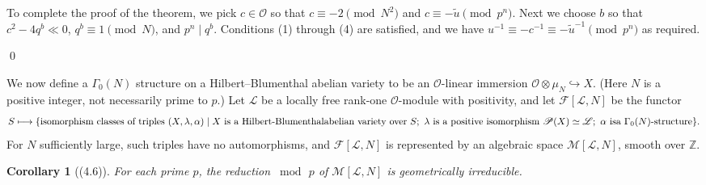 \documentclass[12pt,a4paper]{article}
\theoremstyle{plain}
\newtheorem{corollary}[theorem]{Corollary}
\theoremstyle{definition}
\theoremstyle{remark}
\begin{document}
To complete the proof of the theorem, we pick $c \in \mathcal{O}$ so that $c \equiv -2 \pmod{N^2}$ and $c \equiv -\tilde{u} \pmod{p^n}$. Next we choose $b$ so that $c^2 - 4q^b \ll 0$, $q^b \equiv 1 \pmod{N}$, and $p^n \mid q^b$. Conditions (1) through (4) are satisfied, and we have $u^{-1} \equiv -c^{-1} \equiv -\tilde{u}^{-1} \pmod{p^n}$ as required.

\qed

We now define a $\Gamma_0(N)$ structure on a Hilbert--Blumenthal abelian variety to be an $\mathcal{O}$-linear immersion $\mathcal{O} \otimes \mu_N \hookrightarrow X$. (Here $N$ is a positive integer, not necessarily prime to $p$.) Let $\mathscr{L}$ be a locally free rank-one $\mathcal{O}$-module with positivity, and let $\mathscr{F}[\mathscr{L}, N]$ be the functor
\[
S \longmapsto \{\text{isomorphism classes of triples } (X, \lambda, \alpha) \mid X \text{ is a Hilbert-Blumenthal} \\
\text{abelian variety over } S;\ \lambda \text{ is a positive isomorphism } \mathscr{P}(X) \simeq \mathscr{L};\ \alpha \text{ is} \\
\text{a } \Gamma_0(N)\text{-structure}\}.
\]
For $N$ sufficiently large, such triples have no automorphisms, and $\mathscr{F}[\mathscr{L}, N]$ is represented by an algebraic space $\mathscr{M}[\mathscr{L}, N]$, smooth over $\mathbb{Z}$.

\begin{corollary}[(4.6)]
For each prime $p$, the reduction $\bmod\, p$ of $\mathscr{M}[\mathscr{L}, N]$ is geometrically irreducible.
\end{corollary}
\end{document}
